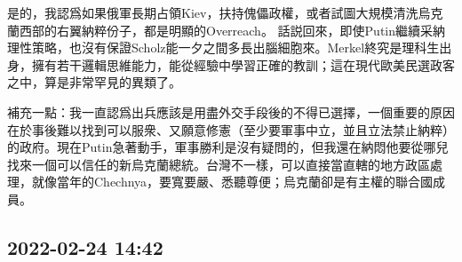 \documentclass[twocolumn]{ctexart}
\begin{document}
是的，我認爲如果俄軍長期占領Kiev，扶持傀儡政權，或者試圖大規模清洗烏克蘭西部的右翼納粹份子，都是明顯的Overreach。
話説回來，即使Putin繼續采納理性策略，也沒有保證Scholz能一夕之間多長出腦細胞來。Merkel終究是理科生出身，擁有若干邏輯思維能力，能從經驗中學習正確的教訓；這在現代歐美民選政客之中，算是非常罕見的異類了。

補充一點：我一直認爲出兵應該是用盡外交手段後的不得已選擇，一個重要的原因在於事後難以找到可以服衆、又願意修憲（至少要軍事中立，並且立法禁止納粹）的政府。現在Putin急著動手，軍事勝利是沒有疑問的，但我還在納悶他要從哪兒找來一個可以信任的新烏克蘭總統。台灣不一樣，可以直接當直轄的地方政區處理，就像當年的Chechnya，要寬要嚴、悉聽尊便；烏克蘭卻是有主權的聯合國成員。
\subsection*{2022-02-24 14:42}
\end{document}

